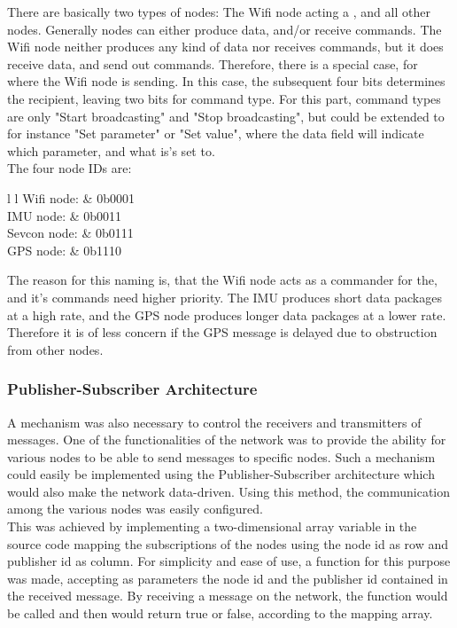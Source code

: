 There are basically two types of nodes: The Wifi node acting a , and all other nodes.
Generally nodes can either produce data, and/or receive commands.
The Wifi node neither produces any kind of data nor receives commands, but it does receive data, and send out commands.
Therefore, there is a special case, for where the Wifi node is sending.
In this case, the subsequent four bits determines the recipient, leaving two bits for command type. 
For this part, command types are only "Start broadcasting" and "Stop broadcasting", but could be extended to for instance "Set parameter" or "Set value", where the data field will indicate which parameter, and what is's set to.\\

The four node IDs are:
\begin{table}[h!]
	\begin{tabular}{{l} {l}}
		Wifi node: & 0b0001 \\
		IMU node: & 0b0011 \\
		Sevcon node: & 0b0111 \\
		GPS node: & 0b1110
	\end{tabular}
\end{table}
The reason for this naming is, that the Wifi node acts as a commander for the, and it's commands need higher priority.
The IMU produces short data packages at a high rate, and the GPS node produces longer data packages at a lower rate. 
Therefore it is of less concern if the GPS message is delayed due to obstruction from other nodes. 

\subsubsection{Publisher-Subscriber Architecture}
A mechanism was also necessary to control the receivers and transmitters of messages.
One of the functionalities of the network was to provide the ability for various nodes to be able to send messages to specific nodes.
Such a mechanism could easily be implemented using the Publisher-Subscriber architecture which would also make the network data-driven.
Using this method, the communication among the various nodes was easily configured.
\\
This was achieved by implementing a two-dimensional array variable in the source code mapping the subscriptions of the nodes using the node id as row and publisher id as column.
For simplicity and ease of use, a function for this purpose was made, accepting as parameters the node id and the publisher id contained in the received message.
By receiving a message on the network, the function would be called and then would return true or false, according to the mapping array.
